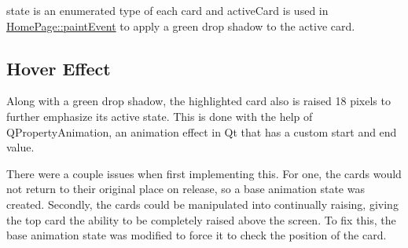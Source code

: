 \begin{DoxyCode}{0}
\DoxyCodeLine{\} \textcolor{keywordflow}{else} \{}
\DoxyCodeLine{\}}
\end{DoxyCode}


{\ttfamily state} is an enumerated type of each card and {\ttfamily active\+Card} is used in {\ttfamily \mbox{\hyperlink{classHomePage_ab3daab17f753e46efcec8968333f88b5}{Home\+Page\+::paint\+Event}}} to apply a green drop shadow to the active card.

\subsection*{Hover Effect}

Along with a green drop shadow, the highlighted card also is raised 18 pixels to further emphasize its active state. This is done with the help of Q\+Property\+Animation, an animation effect in Qt that has a custom start and end value.

There were a couple issues when first implementing this. For one, the cards would not return to their original place on release, so a base animation state was created. Secondly, the cards could be manipulated into continually raising, giving the top card the ability to be completely raised above the screen. To fix this, the base animation state was modified to force it to check the position of the card.

